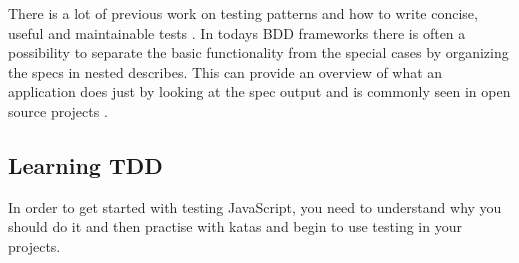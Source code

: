 \documentclass[11pt]{article}
\begin{document}
There is a lot of previous work on testing patterns and how to write concise, useful and maintainable tests \cite[part~III]{TestPatterns}\cite[ch.~3-5]{BDDJS}\cite[p.~461-474]{Tddjs}\cite[p.~86-87]{TestableJS}\cite[p.~13-14]{JasmineBook}. In todays BDD frameworks there is often a possibility to separate the basic functionality from the special cases by organizing the specs in nested describes. This can provide an overview of what an application does just by looking at the spec output and is commonly seen in open source projects \cite[question~42]{Stenmark}.

\subsection{Learning TDD}

In order to get started with testing JavaScript, you need to understand why you should do it \cite[question~38]{Edelstam} and then practise with katas and begin to use testing in your projects.

\printbibliography
\end{document}
